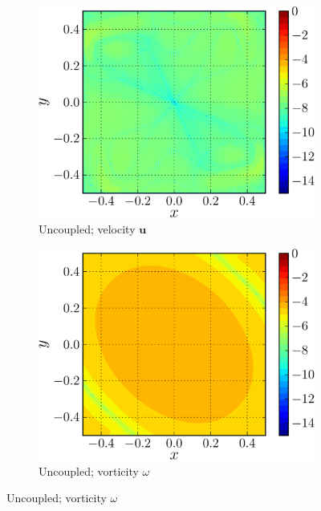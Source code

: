 	\begin{figure}[!b]
     \centering
     \begin{subfigure}[t]{0.45\textwidth}
             \includegraphics[width=\linewidth]{./figures/hybrid/lambOseent2/lambOseen_uncoupled_vErrorFinal_compressed-crop.png}
             \caption{Uncoupled; velocity $\mathbf{u}$}
             \label{fig:lambOseen_uncoupled_vErrorFinal}
     \end{subfigure}%
     \qquad %
     \begin{subfigure}[t]{0.45\textwidth}
             \includegraphics[width=\linewidth]{./figures/hybrid/lambOseent2/lambOseen_uncoupled_wErrorFinal_compressed-crop.png}
             \caption{Uncoupled; vorticity $\omega$}
             \label{fig:lambOseen_uncoupled_wErrorFinal}
     \end{subfigure}%
       

\end{figure}
